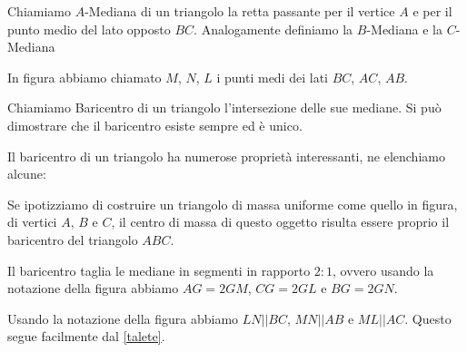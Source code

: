 \documentclass[11pt]{scrartcl}
\begin{document}
	\begin{definition}
		Chiamiamo $A$-Mediana di un triangolo la retta passante per il vertice $A$ e per il punto medio del lato opposto $BC$. Analogamente definiamo la $B$-Mediana e la $C$-Mediana
	\end{definition}
	In figura abbiamo chiamato $M$, $N$, $L$ i punti medi dei lati $BC$, $AC$, $AB$.
	\begin{definition}
		Chiamiamo Baricentro di un triangolo l'intersezione delle sue mediane. Si può dimostrare che il baricentro esiste sempre ed è unico.
	\end{definition}
	Il baricentro di un triangolo ha numerose proprietà interessanti, ne elenchiamo alcune:
	\begin{lemma}
		Se ipotizziamo di costruire un triangolo di massa uniforme come quello in figura, di vertici $A$, $B$ e $C$, il centro di massa di questo oggetto risulta essere proprio il baricentro del triangolo $ABC$.
	\end{lemma}
	\begin{lemma}
		Il baricentro taglia le mediane in segmenti in rapporto $2:1$, ovvero usando la notazione della figura abbiamo $AG=2GM$, $CG=2GL$ e $BG=2GN$.
	\end{lemma}
	\begin{lemma}
		Usando la notazione della figura abbiamo $LN || BC$, $MN || AB$ e $ML || AC$. Questo segue facilmente dal \cref{talete}.
	\end{lemma}
\end{document}
